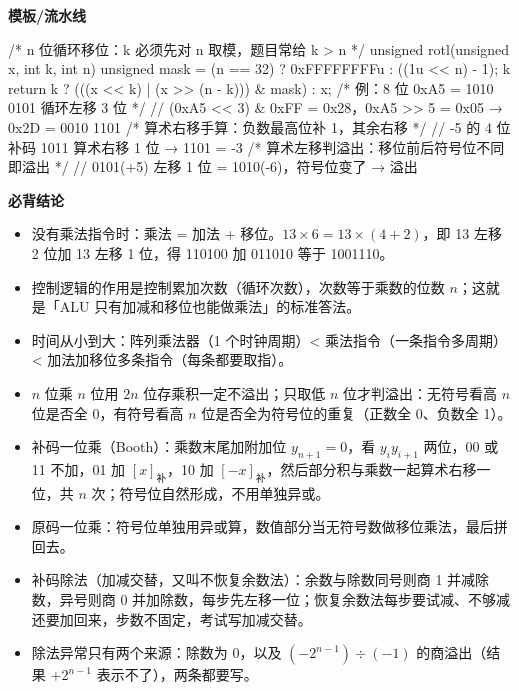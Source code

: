 \documentclass[10pt,a4paper]{ctexart}
\begin{document}
\textbf{模板/流水线}

\begin{codebox}
/* n 位循环移位：k 必须先对 n 取模，题目常给 k > n */
unsigned rotl(unsigned x, int k, int n) {
    unsigned mask = (n == 32) ? 0xFFFFFFFFu : ((1u << n) - 1);
    k %
    return k ? (((x << k) | (x >> (n - k))) & mask) : x;
}
/* 例：8 位 0xA5 = 1010 0101 循环左移 3 位 */
// (0xA5 << 3) & 0xFF = 0x28，0xA5 >> 5 = 0x05 → 0x2D = 0010 1101
/* 算术右移手算：负数最高位补 1，其余右移 */
// -5 的 4 位补码 1011 算术右移 1 位 → 1101 = -3
/* 算术左移判溢出：移位前后符号位不同即溢出 */
// 0101(+5) 左移 1 位 = 1010(-6)，符号位变了 → 溢出
\end{codebox}




\textbf{必背结论}

\begin{itemize}

\item 没有乘法指令时：乘法 = 加法 + 移位。$13\times6=13\times(4+2)$，即 13 左移 2 位加 13 左移 1 位，得 110100 加 011010 等于 1001110。

\item 控制逻辑的作用是控制累加次数（循环次数），次数等于乘数的位数 $n$；这就是「ALU 只有加减和移位也能做乘法」的标准答法。

\item 时间从小到大：阵列乘法器（1 个时钟周期）< 乘法指令（一条指令多周期）< 加法加移位多条指令（每条都要取指）。

\item $n$ 位乘 $n$ 位用 $2n$ 位存乘积一定不溢出；只取低 $n$ 位才判溢出：无符号看高 $n$ 位是否全 0，有符号看高 $n$ 位是否全为符号位的重复（正数全 0、负数全 1）。

\item 补码一位乘（Booth）：乘数末尾加附加位 $y_{n+1}=0$，看 $y_i y_{i+1}$ 两位，00 或 11 不加，01 加 $[x]_补$，10 加 $[-x]_补$，然后部分积与乘数一起算术右移一位，共 $n$ 次；符号位自然形成，不用单独异或。

\item 原码一位乘：符号位单独用异或算，数值部分当无符号数做移位乘法，最后拼回去。

\item 补码除法（加减交替，又叫不恢复余数法）：余数与除数同号则商 1 并减除数，异号则商 0 并加除数，每步先左移一位；恢复余数法每步要试减、不够减还要加回来，步数不固定，考试写加减交替。

\item 除法异常只有两个来源：除数为 0，以及 $(-2^{n-1})\div(-1)$ 的商溢出（结果 $+2^{n-1}$ 表示不了），两条都要写。

\end{itemize}
\end{document}
